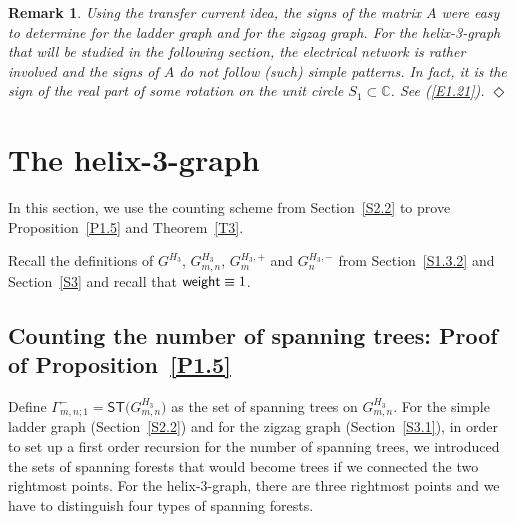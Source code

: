 \documentclass[11pt]{article}
\providecommand{\1}{\mathBB{1}}
\newcommand{\ignore}[1]{}
\renewcommand{\P}{\mathbf{P}}
\newcommand{\C}{{\mathbb{C}}}
\newcommand{\equ}[1]{(\ref{#1})}
\def\SPT{\mathsf{ST}}
\newtheorem{uremark}[proposition]{Remark}
\newenvironment{remark}{\begin{uremark}\em}{\hfill$\Diamond$\end{uremark}}
\newcommand{\Section}[1]{\section{#1}\setcounter{figure}{0}\setcounter{table}{0}\setcounter{equation}{0}}
\newcommand{\weight}{\mathop{\mbox{\sf weight}}}
\begin{document}
\ignore{As long as we consider events that involve only two edges, the signs of off-diagonal entries of $A$ do not matter. But as soon as we have three edges, the signs become relevant. In fact, if you do not like the the electrical network argument given above, you could derive the signs as follows (up to the arbitrary choice of the sign of $A_{0,1}$). Assume $m,n\geq1$ and compute
$$\P^c[z_0,z_m,z_{m+n}\in T]=\frac{w_1M'M^{m-1}M'M^{n-1}N(M')^T(w_1)^T}{\lambda_1^{m+n+1}\,w_1N(w_1)^T}.
$$
With an eigenvalue expansion as in Section~\ref{S2.2}, we can compute
$$\begin{aligned}
\P^c[z_0,z_m,z_{m+n}\in T]&=\left(\frac{1-\alpha}{1+\alpha}\right)^3\Big[
1-\alpha^{2m}-\alpha^{2n}+\alpha^{2m+2n}\Big]\\[2mm]
&=\left(\frac{1-\alpha}{1+\alpha}\right)^3\det\left(
\begin{array}{ccc}
1           &(-\alpha)^m& (-\alpha)^{m+n}\\
(-\alpha)^m    &       1& (-\alpha)^n    \\
(-\alpha)^{m+n}&(-\alpha)^n&        1
\end{array}\right).
\end{aligned}
$$
}
\begin{remark}\label{R3.1}
Using the transfer current idea, the signs of the matrix $A$ were easy to determine for the ladder graph and for the zigzag graph. For the helix-3-graph that will be studied in the following section, the electrical network is rather involved and the signs of $A$ do not follow (such) simple patterns. In fact, it is the sign of the real part of some rotation on the unit circle $S_1\subset\C$. See \equ{E1.21}.
\end{remark}
\Section{The helix-3-graph}
\label{S4}
In this section, we use the counting scheme from Section~\ref{S2.2} to prove Proposition~\ref{P1.5} and Theorem~\ref{T3}.


Recall the definitions of $G^{H_3}$, $G_{m,n}^{H_3}$, $G_{m}^{H_3,+}$ and $G_{n}^{H_3,-}$ from Section~\ref{S1.3.2} and Section~\ref{S3} and recall that $\weight\equiv1$.



\subsection{Counting the number of spanning trees: Proof of Proposition~\ref{P1.5}}
\label{S4.1}

Define $\Gamma^-_{m,n;1}=\SPT\big(G^{H_3}_{m,n}\big)$ as the set of spanning trees on $G^{H_3}_{m,n}$. For the simple ladder graph (Section~\ref{S2.2}) and for the zigzag graph (Section~\ref{S3.1}), in order to set up a first order recursion for the number of spanning trees, we introduced the sets of spanning forests that would become trees if we connected the two rightmost points. For the helix-3-graph, there are three rightmost points and we have to distinguish four types of spanning forests.
\end{document}
